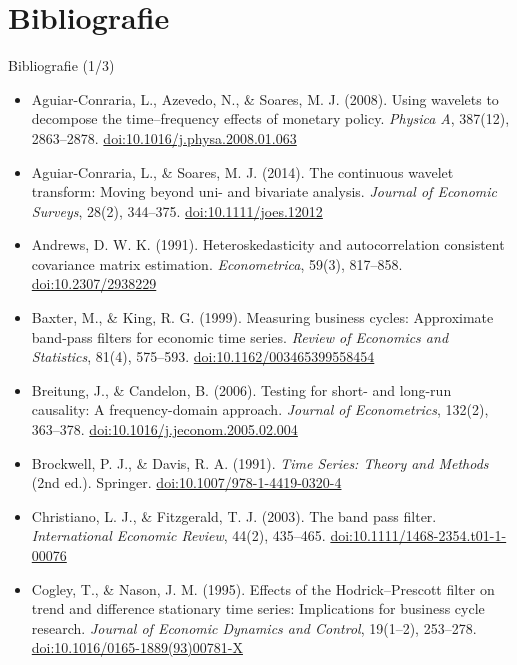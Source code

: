 \section{Bibliografie}

\begin{frame}{Bibliografie (1/3)}
\itemsize{\tiny}
\begin{itemize}
    \item Aguiar-Conraria, L., Azevedo, N., \& Soares, M. J. (2008). Using wavelets to decompose the time--frequency effects of monetary policy. \textit{Physica A}, 387(12), 2863--2878. \href{https://doi.org/10.1016/j.physa.2008.01.063}{doi:10.1016/j.physa.2008.01.063}
    \item Aguiar-Conraria, L., \& Soares, M. J. (2014). The continuous wavelet transform: Moving beyond uni- and bivariate analysis. \textit{Journal of Economic Surveys}, 28(2), 344--375. \href{https://doi.org/10.1111/joes.12012}{doi:10.1111/joes.12012}
    \item Andrews, D. W. K. (1991). Heteroskedasticity and autocorrelation consistent covariance matrix estimation. \textit{Econometrica}, 59(3), 817--858. \href{https://doi.org/10.2307/2938229}{doi:10.2307/2938229}
    \item Baxter, M., \& King, R. G. (1999). Measuring business cycles: Approximate band-pass filters for economic time series. \textit{Review of Economics and Statistics}, 81(4), 575--593. \href{https://doi.org/10.1162/003465399558454}{doi:10.1162/003465399558454}
    \item Breitung, J., \& Candelon, B. (2006). Testing for short- and long-run causality: A frequency-domain approach. \textit{Journal of Econometrics}, 132(2), 363--378. \href{https://doi.org/10.1016/j.jeconom.2005.02.004}{doi:10.1016/j.jeconom.2005.02.004}
    \item Brockwell, P. J., \& Davis, R. A. (1991). \textit{Time Series: Theory and Methods} (2nd ed.). Springer. \href{https://doi.org/10.1007/978-1-4419-0320-4}{doi:10.1007/978-1-4419-0320-4}
    \item Christiano, L. J., \& Fitzgerald, T. J. (2003). The band pass filter. \textit{International Economic Review}, 44(2), 435--465. \href{https://doi.org/10.1111/1468-2354.t01-1-00076}{doi:10.1111/1468-2354.t01-1-00076}
    \item Cogley, T., \& Nason, J. M. (1995). Effects of the Hodrick--Prescott filter on trend and difference stationary time series: Implications for business cycle research. \textit{Journal of Economic Dynamics and Control}, 19(1--2), 253--278. \href{https://doi.org/10.1016/0165-1889(93)00781-X}{doi:10.1016/0165-1889(93)00781-X}

\end{itemize}
\end{frame}
